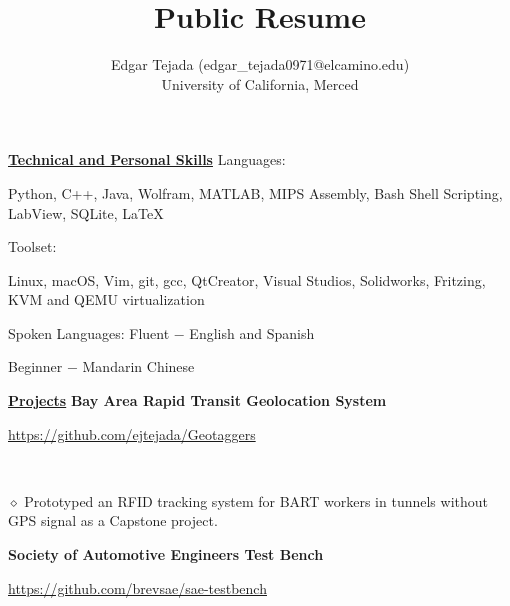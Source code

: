 \documentclass [11pt]{article}
\title{Public Resume}
\author{Edgar Tejada (edgar_tejada0971@elcamino.edu)\\University of California, Merced}
\begin{document}
\begin{flushleft}

\underline{\textbf{Technical and Personal Skills}}
\linebreak
Languages{:}\begin{minipage}{0.87\linewidth}\begin{flushright}Python, C++, ‬Java,‭ ‬Wolfram,‭ ‬MATLAB,‭ MIPS Assembly,‭ ‬Bash Shell Scripting, ‬LabView, ‬SQLite, \LaTeX\end{flushright}\end{minipage}\newline
Toolset{:}‭\begin{minipage}{0.9\linewidth}\begin{center}Linux, ‬macOS, ‬Vim, ‬git, ‬gcc, ‬QtCreator, ‬Visual Studios, Solidworks, Fritzing, KVM and QEMU virtualization\end{center}\end{minipage}\newline
Spoken Languages{:} Fluent $-$ ‬English and ‬Spanish\begin{minipage}{0.55\linewidth}\begin{flushright}Beginner $-$ Mandarin Chinese\end{flushright}\end{minipage}\newline

\underline{\textbf{Projects}}
\linebreak
\textbf{Bay Area Rapid Transit Geolocation System}\begin{minipage}{0.61 \linewidth}\begin{flushright}\href{https://github.com/ejtejada/Geotaggers}{https://github.com/ejtejada/Geotaggers}\end{flushright}\end{minipage}

‭	\begin{minipage}{1.0 \linewidth}\begin{flushright}$\diamond$ Prototyped an RFID tracking system for BART workers in tunnels without GPS signal as a Capstone project. \end{flushright}\end{minipage}

\textbf{Society of Automotive Engineers Test Bench}\begin{minipage}{0.61 \linewidth}\begin{flushright}\href{https://github.com/brevsae/sae-testbench}{https://github.com/brevsae/sae-testbench}\end{flushright}\end{minipage}


\end{flushleft}
\end{document}
